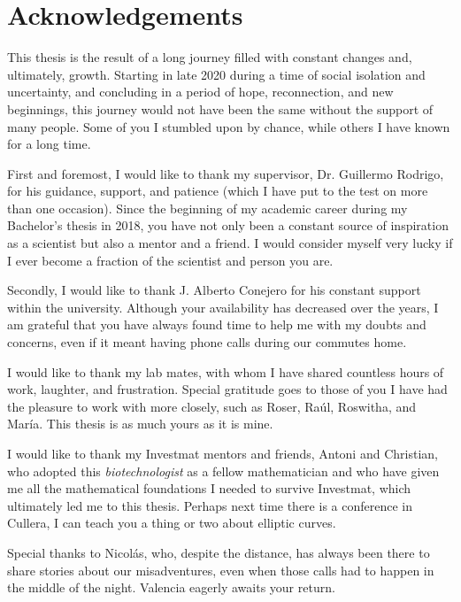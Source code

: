 \chapter*{Acknowledgements}
\thispagestyle{myacknowledgements}

This thesis is the result of a long journey filled with constant changes and, ultimately, growth. Starting in late 2020 during a time of social isolation and uncertainty, and concluding in a period of hope, reconnection, and new beginnings, this journey would not have been the same without the support of many people. Some of you I stumbled upon by chance, while others I have known for a long time.

First and foremost, I would like to thank my supervisor, Dr. Guillermo Rodrigo, for his guidance, support, and patience (which I have put to the test on more than one occasion). Since the beginning of my academic career during my Bachelor's thesis in 2018, you have not only been a constant source of inspiration as a scientist but also a mentor and a friend. I would consider myself very lucky if I ever become a fraction of the scientist and person you are.

Secondly, I would like to thank J. Alberto Conejero for his constant support within the university. Although your availability has decreased over the years, I am grateful that you have always found time to help me with my doubts and concerns, even if it meant having phone calls during our commutes home.

I would like to thank my lab mates, with whom I have shared countless hours of work, laughter, and frustration. Special gratitude goes to those of you I have had the pleasure to work with more closely, such as Roser, Raúl, Roswitha, and María. This thesis is as much yours as it is mine.

I would like to thank my Investmat mentors and friends, Antoni and Christian, who adopted this \textit{biotechnologist} as a fellow mathematician and who have given me all the mathematical foundations I needed to survive Investmat, which ultimately led me to this thesis. Perhaps next time there is a conference in Cullera, I can teach you a thing or two about elliptic curves.

Special thanks to Nicolás, who, despite the distance, has always been there to share stories about our misadventures, even when those calls had to happen in the middle of the night. Valencia eagerly awaits your return.

